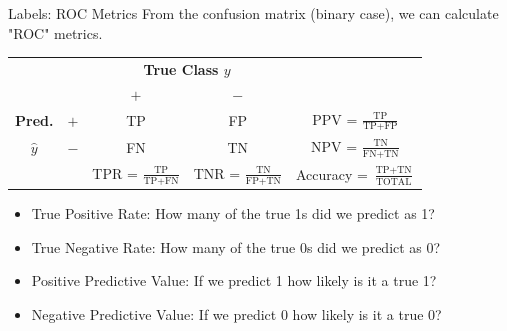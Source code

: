 \documentclass[11pt,compress,t,notes=noshow, xcolor=table]{beamer}
\begin{document}
\begin{vbframe}{Labels: ROC Metrics}
From the confusion matrix (binary case), we can calculate "ROC" metrics.



\begin{center}
\small
\renewcommand{\arraystretch}{1.5}
\begin{tabular}{cc||cc|c}
    & & \multicolumn{2}{c|}{\bfseries True Class $y$} & \\
    & & $+$ & $-$ & \\ 
    \hline \hline
    \bfseries Pred.     & $+$ & TP & FP & PPV = $\frac{\text{TP}}{\text{TP} + \text{FP}}$\\
              $\hat{y}$ & $-$ & FN & TN & NPV = $\frac{\text{TN}}{\text{FN} + \text{TN}}$\\
    \hline
    & & TPR = $\frac{\text{TP}}{\text{TP} + \text{FN}}$ & TNR = $\frac{\text{TN}}{\text{FP} + \text{TN}}$ & Accuracy = $\frac{\text{TP}+ \text{TN}}{\text{TOTAL}}$
\end{tabular}
\renewcommand{\arraystretch}{1}
\end{center}

\begin{itemize}
  \item True Positive Rate: How many of the true 1s did we predict as 1?
  \item True Negative Rate: How many of the true 0s did we predict as 0?
  \item Positive Predictive Value: If we predict 1 how likely is it a true 1?
  \item Negative Predictive Value: If we predict 0 how likely is it a true 0?
\end{itemize}
\end{vbframe}
\end{document}
